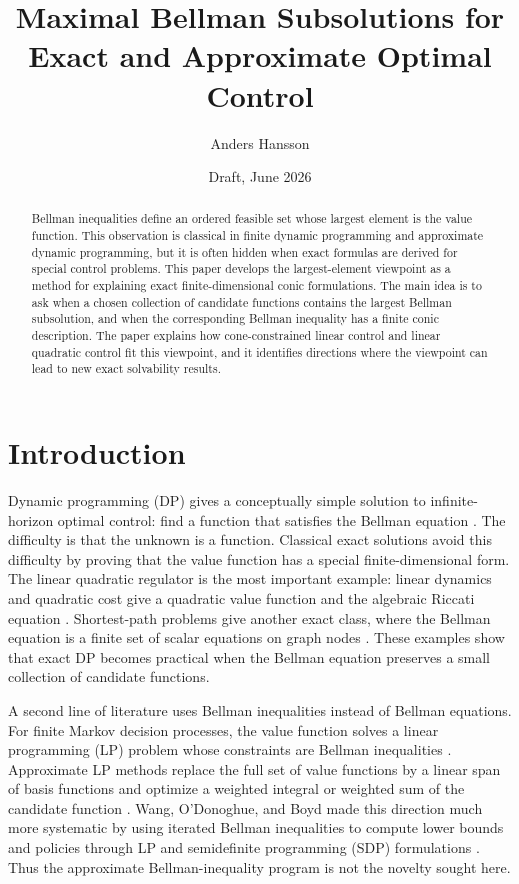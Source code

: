 \documentclass{article}
\title{Maximal Bellman Subsolutions for Exact and Approximate Optimal Control}
\author{Anders Hansson}
\date{Draft, June 2026}
\begin{document}
\maketitle

\begin{abstract}
Bellman inequalities define an ordered feasible set whose largest element is the value function. This observation is classical in finite dynamic programming and approximate dynamic programming, but it is often hidden when exact formulas are derived for special control problems. This paper develops the largest-element viewpoint as a method for explaining exact finite-dimensional conic formulations. The main idea is to ask when a chosen collection of candidate functions contains the largest Bellman subsolution, and when the corresponding Bellman inequality has a finite conic description. The paper explains how cone-constrained linear control and linear quadratic control fit this viewpoint, and it identifies directions where the viewpoint can lead to new exact solvability results.
\end{abstract}

\section{Introduction}

Dynamic programming (DP) gives a conceptually simple solution to infinite-horizon optimal control: find a function that satisfies the Bellman equation \cite{bellman-1957,bertsekas-2007}. The difficulty is that the unknown is a function. Classical exact solutions avoid this difficulty by proving that the value function has a special finite-dimensional form. The linear quadratic regulator is the most important example: linear dynamics and quadratic cost give a quadratic value function and the algebraic Riccati equation \cite{kalman-1960}. Shortest-path problems give another exact class, where the Bellman equation is a finite set of scalar equations on graph nodes \cite{dijkstra-1959}. These examples show that exact DP becomes practical when the Bellman equation preserves a small collection of candidate functions.

A second line of literature uses Bellman inequalities instead of Bellman equations. For finite Markov decision processes, the value function solves a linear programming (LP) problem whose constraints are Bellman inequalities \cite{manne-1960,bertsekas-2007}. Approximate LP methods replace the full set of value functions by a linear span of basis functions and optimize a weighted integral or weighted sum of the candidate function \cite{de-farias-van-roy-2003,powell-2022}. Wang, O'Donoghue, and Boyd made this direction much more systematic by using iterated Bellman inequalities to compute lower bounds and policies through LP and semidefinite programming (SDP) formulations \cite{wang-odonoghue-boyd-2015}. Thus the approximate Bellman-inequality program is not the novelty sought here.
\end{document}
